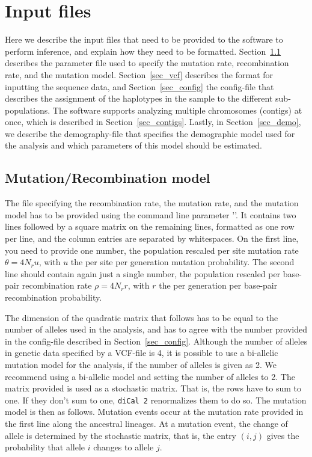 \documentclass{article}
\numberwithin{equation}{section}
\begin{document}
\section{Input files}
\label{sec_input}

Here we describe the input files that need to be provided to the software to perform inference, and explain how they need to be formatted. Section~\ref{sec_param} describes the parameter file used to specify the mutation rate, recombination rate, and the mutation model.  Section~\ref{sec_vcf} describes the format for inputting the sequence data, and Section~\ref{sec_config} the config-file that describes the assignment of the haplotypes in the sample to the different sub-populations. The software supports analyzing multiple chromosomes (contigs) at once, which is described in Section~\ref{sec_contigs}. Lastly, in Section~\ref{sec_demo}, we describe the demography-file that specifies the demographic model used for the analysis and which parameters of this model should be estimated. 

\subsection{Mutation/Recombination model}
\label{sec_param}

The file specifying the recombination rate, the mutation rate, and the mutation model has to be provided using the command line parameter '\texttt{}'. It contains two lines followed by a square matrix on the remaining lines, formatted as one row per line, and the column entries are separated by whitespaces. On the first line, you need to provide one number, the population rescaled per site mutation rate $\theta = 4 N_r u$, with $u$ the per site per generation mutation probability. The second line should contain again just a single number, the population rescaled per base-pair recombination rate $\rho = 4 N_r r$, with $r$ the per generation per base-pair recombination probability.

The dimension of the quadratic matrix that follows has to be equal to the number of alleles used in the analysis, and has to agree with the number provided in the config-file described in Section~\ref{sec_config}. Although the number of alleles in genetic data specified by a VCF-file is 4, it is possible to use a bi-allelic mutation model for the analysis, if the number of alleles is given as 2. We recommend using a bi-allelic model and setting the number of alleles to 2. The matrix provided is used as a stochastic matrix. That is, the rows have to sum to one. If they don't sum to one, \texttt{diCal 2} renormalizes them to do so. The mutation model is then as follows. Mutation events occur at the mutation rate provided in the first line along the ancestral lineages. At a mutation event, the change of allele is determined by the stochastic matrix, that is, the entry $(i,j)$ gives the probability that allele $i$ changes to allele $j$.
\end{document}
